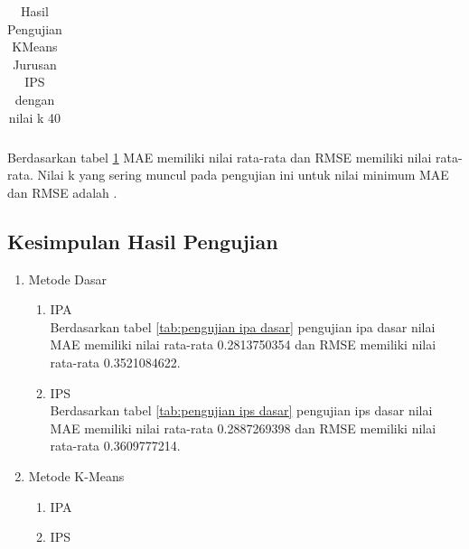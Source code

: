 \begin{enumerate}
\begin{enumerate}
\begin{longtable}[H]{|c|c|c|c|c|c|c|}
                    
                     \caption{Hasil Pengujian KMeans Jurusan IPS dengan nilai k 40}
                    \label{tab:ips k = 40}
                \end{longtable}
                
                Berdasarkan tabel \ref{tab:ips k = 40} MAE memiliki nilai rata-rata dan RMSE memiliki nilai rata-rata. Nilai k yang sering muncul pada pengujian ini untuk nilai minimum MAE dan RMSE adalah .
        \end{enumerate}
\end{enumerate}


\subsection{Kesimpulan Hasil Pengujian}
\label{subsec:kesimpulan hasil pengujian}

\begin{enumerate}
    \item Metode Dasar 
        \begin{enumerate}
            \item IPA \\
                Berdasarkan tabel \ref{tab:pengujian ipa dasar} pengujian ipa dasar nilai MAE memiliki nilai rata-rata 0.2813750354 dan RMSE memiliki nilai rata-rata 0.3521084622.
            
            \item IPS \\
                Berdasarkan tabel \ref{tab:pengujian ips dasar} pengujian ips dasar nilai MAE memiliki nilai rata-rata 0.2887269398 dan RMSE memiliki nilai rata-rata 	0.3609777214.
                
        \end{enumerate}
    
    \item Metode K-Means
        \begin{enumerate}
            \item IPA
            
            \item IPS
        \end{enumerate}
        
\end{enumerate}